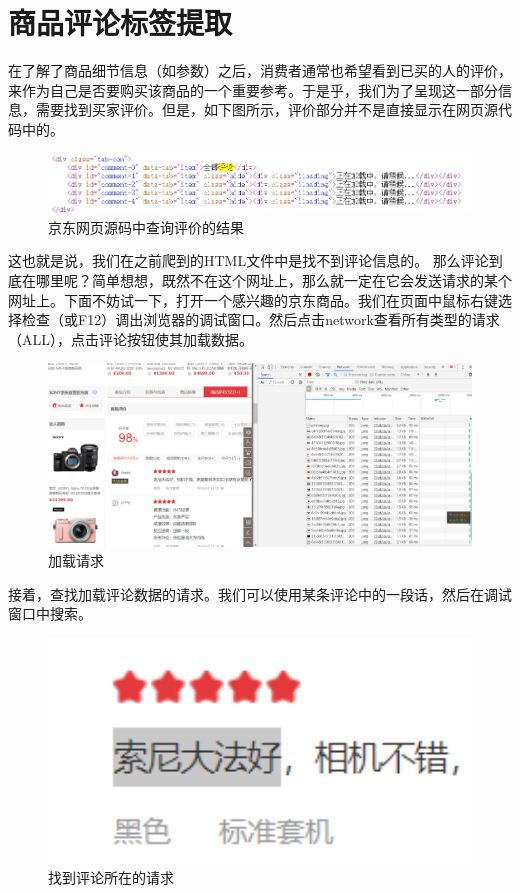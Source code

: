 \section{商品评论标签提取}
在了解了商品细节信息（如参数）之后，消费者通常也希望看到已买的人的评价，来作为自己是否要购买该商品的一个重要参考。于是乎，我们为了呈现这一部分信息，需要找到买家评价。但是，如下图所示，评价部分并不是直接显示在网页源代码中的。

\begin{figure}[htbp]
\centering
\includegraphics[width=13.5cm]{TIM图片20200111131428.png}
\caption{京东网页源码中查询评价的结果} %
\end{figure}

这也就是说，我们在之前爬到的HTML文件中是找不到评论信息的。
那么评论到底在哪里呢？简单想想，既然不在这个网址上，那么就一定在它会发送请求的某个网址上。下面不妨试一下，打开一个感兴趣的京东商品。我们在页面中鼠标右键选择检查（或F12）调出浏览器的调试窗口。然后点击network查看所有类型的请求（ALL），点击评论按钮使其加载数据。

\begin{figure}[htbp]
\centering
\includegraphics[width=13.5cm]{TIM图片20200111132633.png}
\caption{加载请求} %
\end{figure}

接着，查找加载评论数据的请求。我们可以使用某条评论中的一段话，然后在调试窗口中搜索。
\begin{figure}[htbp]
\centering
\includegraphics[width=13.5cm]{TIM图片20200111132832.png}
\caption{找到评论所在的请求} %
\end{figure}

